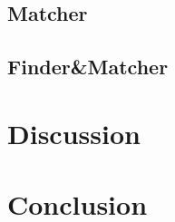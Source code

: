 \documentclass{article}
\begin{document}
\subsection{Matcher}

\subsection{Finder\&Matcher}


\section{Discussion}


\section{Conclusion}





\newpage





\end{document}
